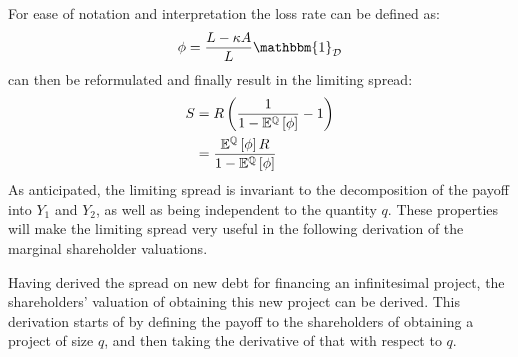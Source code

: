 \documentclass[../main.tex]{subfiles}
\begin{document}
        For ease of notation and interpretation the loss rate can be defined as:
            \begin{equation}
                \phi = \frac{
                        L - \kappa A
                    }{
                        L
                    } 
                \mathbbm{1}_{\mathcal{D}}
                \label{eqn:creditor-loss-rate}
            \end{equation}
         can then be reformulated and finally result in the limiting spread:
            \begin{align}
                    S
                &=
                    R
                    \left(
                        \frac{
                            1   
                        }{
                            1
                            -
                            \mathbb{E}^{\mathbb{Q}}\left[
                                \phi
                            \right]
                        }
                        - 
                        1
                    \right)
                \nonumber \\
                &=
                    \frac{
                        \mathbb{E}^{\mathbb{Q}}\left[\phi\right]
                        R
                    }{
                        1
                        -
                        \mathbb{E}^{\mathbb{Q}}\left[\phi\right]
                    }
                \label{eqn:limiting-spread}
            \end{align}
        As anticipated, the limiting spread is invariant to the decomposition of the payoff into $Y_{1}$ and $Y_{2}$,
        as well as being independent to the quantity $q$. 
        These properties will make the limiting spread very useful in the following derivation
        of the marginal shareholder valuations.

        Having derived the spread on new debt for financing an infinitesimal project,
        the shareholders' valuation of obtaining this new project can be derived.
        This derivation starts of by defining the payoff to the shareholders 
        of obtaining a project of size $q$,
        and then taking the derivative of that with respect to $q$.
        
\end{document}
